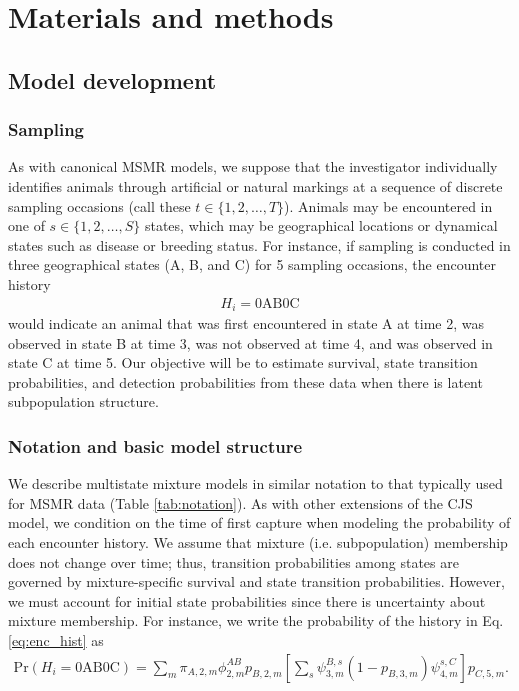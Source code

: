 \documentclass[times,mee,doublespace,]{besauth2}
\begin{document}
\section{Materials and methods}

\subsection{Model development}

\subsubsection{Sampling}

As with canonical MSMR models, we suppose that the investigator individually identifies animals through artificial or natural markings at a sequence of discrete sampling occasions (call these  $t \in \{ 1, 2, \hdots, T \}$). Animals may be encountered in one of $s \in \{ 1, 2, \hdots, S \}$ states, which may be geographical locations or dynamical states such as disease or breeding status. For instance, if sampling is conducted in three geographical states (A, B, and C) for 5 sampling occasions, the encounter history
\begin{eqnarray*}
  \label{eq:enc_hist}
  H_i = \textrm{0AB0C}
\end{eqnarray*}
would indicate an animal that was first encountered in state A at time 2, was observed in state B at time 3, was not observed at time 4, and was observed in state C at time 5.  Our objective will be to estimate survival, state transition probabilities, and detection probabilities from these data when there is latent subpopulation structure.

\subsubsection{Notation and basic model structure}

We describe multistate mixture models in similar notation to that typically used for MSMR data (Table \ref{tab:notation}).  As with other extensions of the CJS model, we condition on the time of first capture when modeling the probability of each encounter history.
We assume that mixture (i.e. subpopulation) membership does not change over time; thus, transition probabilities among states are governed by mixture-specific survival and state transition probabilities.  However, we must account for initial state probabilities since there is uncertainty about mixture membership.  For instance, we write the probability of the history in Eq. \ref{eq:enc_hist} as
\begin{eqnarray*}
  \textrm{Pr}(H_i = \textrm{0AB0C}) = \sum_m \pi_{A,2,m} \phi_{2,m}^{AB} p_{B,2,m} \left[ \sum_s \psi_{3,m}^{B,s} (1-p_{B,3,m}) \psi_{4,m}^{s,C} \right] p_{C,5,m}.
\end{eqnarray*}
\end{document}
